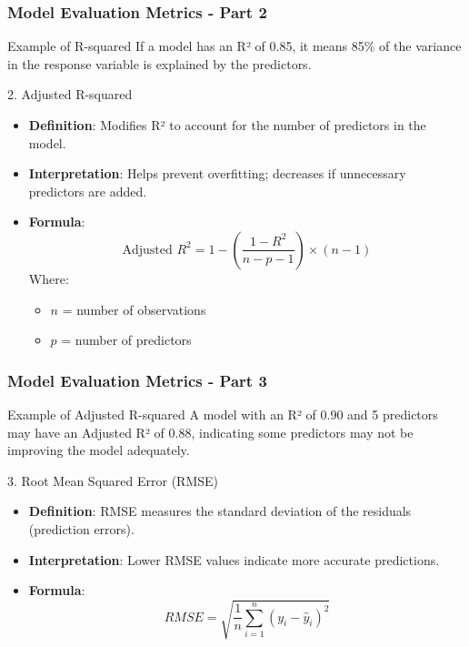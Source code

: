 \documentclass{beamer}
\begin{document}
\begin{frame}[fragile]
    \frametitle{Model Evaluation Metrics - Part 2}
    \begin{block}{Example of R-squared}
        If a model has an R² of 0.85, it means 85\% of the variance in the response variable is explained by the predictors.
    \end{block}
    
    \begin{block}{2. Adjusted R-squared}
        \begin{itemize}
            \item \textbf{Definition}: Modifies R² to account for the number of predictors in the model.
            \item \textbf{Interpretation}: Helps prevent overfitting; decreases if unnecessary predictors are added.
            \item \textbf{Formula}:
            \begin{equation}
                \text{Adjusted } R^2 = 1 - \left( \frac{1 - R^2}{n - p - 1} \right) \times (n - 1)
            \end{equation}
            Where:
            \begin{itemize}
                \item \( n \) = number of observations
                \item \( p \) = number of predictors
            \end{itemize}
        \end{itemize}
    \end{block}
\end{frame}

\begin{frame}[fragile]
    \frametitle{Model Evaluation Metrics - Part 3}
    \begin{block}{Example of Adjusted R-squared}
        A model with an R² of 0.90 and 5 predictors may have an Adjusted R² of 0.88, indicating some predictors may not be improving the model adequately.
    \end{block}
    
    \begin{block}{3. Root Mean Squared Error (RMSE)}
        \begin{itemize}
            \item \textbf{Definition}: RMSE measures the standard deviation of the residuals (prediction errors).
            \item \textbf{Interpretation}: Lower RMSE values indicate more accurate predictions.
            \item \textbf{Formula}:
            \begin{equation}
                RMSE = \sqrt{\frac{1}{n} \sum_{i=1}^{n} (y_i - \hat{y}_i)^2}
            \end{equation}
        \end{itemize}
    \end{block}
\end{frame}
\end{document}
